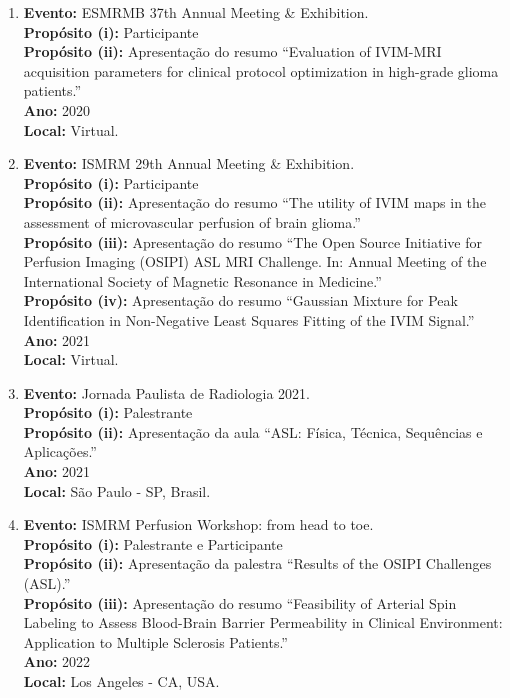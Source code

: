 \documentclass[a4paper,oneside,10pt]{article}
\begin{document}
\begin{enumerate}
        \item   \textbf{Evento:} ESMRMB 37th Annual Meeting \& Exhibition. \mbox{} \\
        \textbf{Propósito (i):} Participante \\
        \textbf{Propósito (ii):} Apresentação do resumo ``Evaluation of IVIM-MRI acquisition parameters for clinical protocol optimization in high-grade glioma patients.''\\
        \textbf{Ano:} 2020\\
        \textbf{Local:} Virtual.

        \item   \textbf{Evento:} ISMRM 29th Annual Meeting \& Exhibition. \mbox{} \\
        \textbf{Propósito (i):} Participante \\
        \textbf{Propósito (ii):} Apresentação do resumo ``The utility of IVIM maps in the assessment of microvascular perfusion of brain glioma.''\\
        \textbf{Propósito (iii):} Apresentação do resumo ``The Open Source Initiative for Perfusion Imaging (OSIPI) ASL MRI Challenge. In: Annual Meeting of the International Society of Magnetic Resonance in Medicine.''\\
        \textbf{Propósito (iv):} Apresentação do resumo ``Gaussian Mixture for Peak Identification in Non-Negative Least Squares Fitting of the IVIM Signal.''\\
        \textbf{Ano:} 2021\\
        \textbf{Local:} Virtual.

        \item   \textbf{Evento:} Jornada Paulista de Radiologia 2021. \mbox{} \\
        \textbf{Propósito (i):} Palestrante \\
        \textbf{Propósito (ii):} Apresentação da aula ``ASL: Física, Técnica, Sequências e Aplicações.''\\
        \textbf{Ano:} 2021\\
        \textbf{Local:} São Paulo - SP, Brasil.

        \item   \textbf{Evento:} ISMRM Perfusion Workshop: from head to toe. \mbox{} \\
        \textbf{Propósito (i):} Palestrante e Participante \\
        \textbf{Propósito (ii):} Apresentação da palestra ``Results of the OSIPI Challenges (ASL).''\\
        \textbf{Propósito (iii):} Apresentação do resumo ``Feasibility of Arterial Spin Labeling to Assess Blood-Brain Barrier Permeability in Clinical Environment: Application to Multiple Sclerosis Patients.''\\
        \textbf{Ano:} 2022\\
        \textbf{Local:} Los Angeles - CA, USA.

\end{enumerate}
\end{document}
